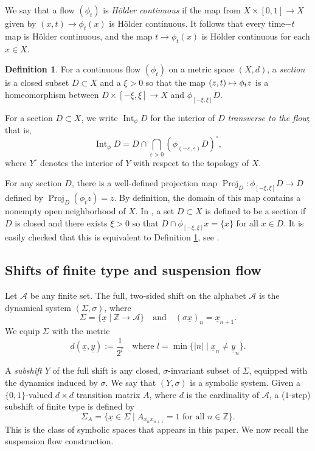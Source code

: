 \documentclass[JEP,XML,SOM,Unicode,NoFloatCountersInSection]{cedram}
\let\mathcal\mathscr
\let\epsilon\varepsilon
\let\sep\mid
\def\mto{\mathchoice{\longmapsto}{\mapsto}{\mapsto}{\mapsto}}
\theoremstyle{definition}
\newtheorem{defn}[thm]{Definition}
\numberwithin{equation}{section}
\DeclareMathOperator{\Int}{Int}
\DeclareMathOperator{\Proj}{Proj}
\begin{document}
We say that a flow $(\phi_t)$ is \emph{Hölder continuous} if the map from $X \times [0,1] \to X$ given by $(x,t) \to \phi_t(x)$ is Hölder continuous. It follows that every time$-t$ map is Hölder continuous, and the map $t \to \phi_t(x)$ is Hölder continuous for each $x\in X$.

\begin{defn}\label{defn:section}
For a continuous flow $( \phi_t )$ on a metric space $(X,d)$, a \emph{section} is a closed subset $D\subset X$ and a $\xi>0$ so that the map $(z,t) \mto \phi_tz$ is a homeomorphism between $D \times [-\xi, \xi] \to X$ and $\phi_{[-\xi,\xi]}D$.
\end{defn}

For a section $D \subset X$, we write $\Int_\phi D$ for the interior of $D$ \emph{transverse to the flow}; that is,
\[\Int_\phi D = D \cap \bigcap_{\epsilon>0}(\phi_{(-\epsilon,\epsilon)}D)^\circ,\]
where $Y^\circ$ denotes the interior of $Y$ with respect to the topology of $X$.

For any section $D$, there is a well-defined projection map $\Proj_D: \phi_{[-\xi,\xi]}D \to D$ defined by $\Proj_D(\phi_tz) =z$. By definition, the domain of this map contains a nonempty open neighborhood of $X$. In \cite{BW}, a set $D \subset X$ is defined to be a section if $D$ is closed and there exists $\xi>0$ so that $D \cap \phi_{[-\xi,\xi]}x = \{x\}$ for all $x \in D$. It is easily checked that this is equivalent to Definition \ref{defn:section}, see \cite[\S 5]{BW}.

\subsection{Shifts of finite type and suspension flow}

Let $\mathcal{A}$ be any finite set. The full, two-sided shift on the alphabet $\mathcal{A}$ is the dynamical system $(\Sigma, \sigma)$, where
\[ \Sigma = \{ \underline x\sep \mathbb{Z} \to \mathcal{A} \} \quad \mbox{and} \quad (\sigma \underline x)_n = \underline x_{n+1}. \]
We equip $\Sigma$ with the metric
\[ d(\underline x, \underline y) := \frac{1}{2^l} \quad \mbox{where } l = \min\{|n|\sep\underline x_n \neq \underline y_n\}. \]

A \emph{subshift} $Y$ of the full shift is any closed, $\sigma$-invariant subset of $\Sigma$, equipped with the dynamics induced by $\sigma$. We say that $(Y, \sigma)$ is a symbolic system. Given a $\{0,1\}$-valued $d \times d $ transition matrix $A$, where $d$ is the cardinality of $\mathcal{A}$, a ($1$-step) subshift of finite type is defined by
\[
\Sigma_A = \{\underline x \in \Sigma \sep A_{x_n x_{n+1}}=1 \mbox{ for all } n\in \mathbb{Z}\}.
\]
This is the class of symbolic spaces that appears in this paper. We now recall the suspension flow construction.
\end{document}
